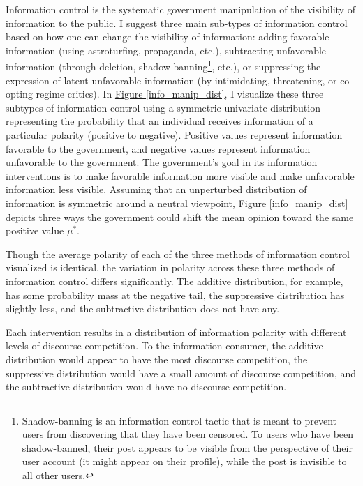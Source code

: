 \documentclass[11pt]{article}
\begin{document}
Information control is the systematic government manipulation of the visibility of information to the public. I suggest three main sub-types of information control based on how one can change the visibility of information: adding favorable information (using astroturfing, propaganda, etc.), subtracting unfavorable information (through deletion, shadow-banning\footnote{Shadow-banning is an information control tactic that is meant to prevent users from discovering that they have been censored. To users who have been shadow-banned, their post appears to be visible from the perspective of their user account (it might appear on their profile), while the post is invisible to all other users.}, etc.), or suppressing the expression of latent unfavorable information (by intimidating, threatening, or co-opting regime critics). In \hyperref[info_manip_dist]{Figure \ref*{info_manip_dist}}, I visualize these three subtypes of information control using a symmetric univariate distribution representing the probability that an individual receives information of a particular polarity (positive to negative). Positive values represent information favorable to the government, and negative values represent information unfavorable to the government. The government's goal in its information interventions is to make favorable information more visible and make unfavorable information less visible. Assuming that an unperturbed distribution of information is symmetric around a neutral viewpoint, \hyperref[info_manip_dist]{Figure \ref*{info_manip_dist}} depicts three ways the government could shift the mean opinion toward the same positive value $\mu^*$.

Though the average polarity of each of the three methods of information control visualized is identical, the variation in polarity across these three methods of information control differs significantly. The additive distribution, for example, has some probability mass at the negative tail, the suppressive distribution has slightly less, and the subtractive distribution does not have any.

Each intervention results in a distribution of information polarity with different levels of discourse competition. To the information consumer, the additive distribution would appear to have the most discourse competition, the suppressive distribution would have a small amount of discourse competition, and the subtractive distribution would have no discourse competition.
\end{document}
